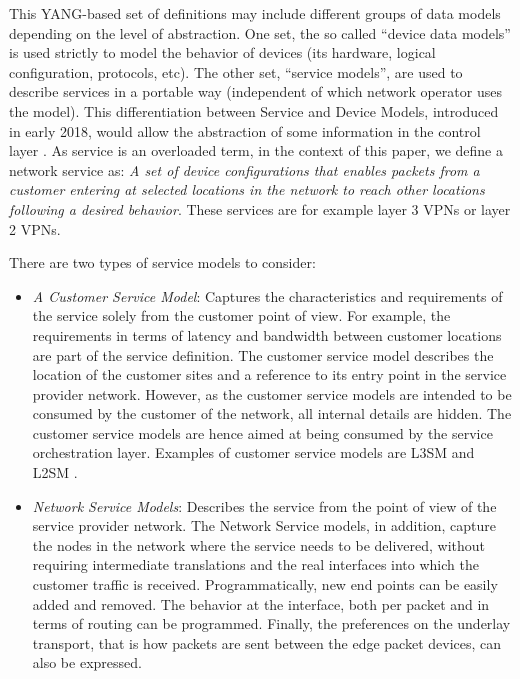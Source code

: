 \documentclass[a4paper,fleqn]{cas-dc}
\begin{document}
This YANG-based set of definitions may include different groups of data models depending on the level of abstraction. One set, the so called “device data models” is used strictly to model the behavior of devices (its hardware, logical configuration, protocols, etc). The other set, “service models”, are used to describe services in a portable way (independent of which network operator uses the model). This differentiation between Service and Device Models, introduced in early 2018, would allow the abstraction of some information in the control layer \cite{wu2017service}. As service is an overloaded term, in the context of this paper, we define a network service as: \textit{A set of device configurations that enables packets from a customer entering at selected locations in the network to reach other locations following a desired behavior}. These services are for example layer 3 VPNs or layer 2 VPNs. 

There are two types of service models to consider:
\begin{itemize}
\item 	\textit{A Customer Service Model}: Captures the characteristics and requirements of the service solely from the customer point of view. For example, the requirements in terms of latency and bandwidth between customer locations are part of the service definition. The customer service model describes the location of the customer sites and a reference to its entry point in the service provider network. However, as the customer service models are intended to be consumed by the customer of the network, all internal details are hidden. The customer service models are hence aimed at being consumed by the service orchestration layer. Examples of customer service models are L3SM \cite{rosen2006rfc} and L2SM \cite{wen2018yang}.

\item 	\textit{Network Service Models}:  Describes the service from the point of view of the service provider network. The Network Service models, in addition, capture the nodes in the network where the service needs to be delivered, without requiring intermediate translations and the real interfaces into which the customer traffic is received. Programmatically, new end points can be easily added and removed. The behavior at the interface, both per packet and in terms of routing can be programmed. Finally, the preferences on the underlay transport, that is how packets are sent between the edge packet devices, can also be expressed.
\end{itemize}
\end{document}
